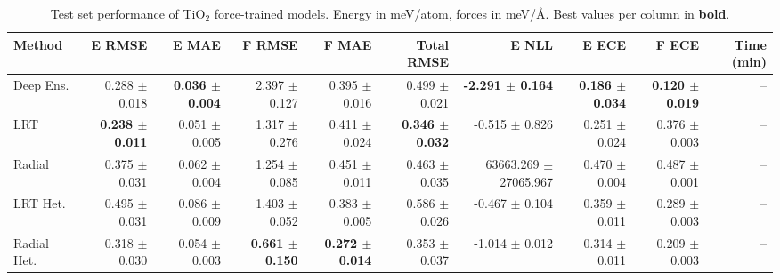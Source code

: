 \begin{table}
\centering
\caption{Test set performance of TiO$_2$ force-trained models. Energy in meV/atom, forces in meV/\AA{}. Best values per column in \textbf{bold}.}
\label{tab:tio2_results}
\begin{tabular}{lrrrrrrrrr}
\toprule
Method & E RMSE & E MAE & F RMSE & F MAE & Total RMSE & E NLL & E ECE & F ECE & Time (min) \\
\midrule
Deep Ens. & 0.288 $\pm$ 0.018 & \textbf{0.036 $\pm$ 0.004} & 2.397 $\pm$ 0.127 & 0.395 $\pm$ 0.016 & 0.499 $\pm$ 0.021 & \textbf{-2.291 $\pm$ 0.164} & \textbf{0.186 $\pm$ 0.034} & \textbf{0.120 $\pm$ 0.019} & -- \\
LRT & \textbf{0.238 $\pm$ 0.011} & 0.051 $\pm$ 0.005 & 1.317 $\pm$ 0.276 & 0.411 $\pm$ 0.024 & \textbf{0.346 $\pm$ 0.032} & -0.515 $\pm$ 0.826 & 0.251 $\pm$ 0.024 & 0.376 $\pm$ 0.003 & -- \\
Radial & 0.375 $\pm$ 0.031 & 0.062 $\pm$ 0.004 & 1.254 $\pm$ 0.085 & 0.451 $\pm$ 0.011 & 0.463 $\pm$ 0.035 & 63663.269 $\pm$ 27065.967 & 0.470 $\pm$ 0.004 & 0.487 $\pm$ 0.001 & -- \\
LRT Het. & 0.495 $\pm$ 0.031 & 0.086 $\pm$ 0.009 & 1.403 $\pm$ 0.052 & 0.383 $\pm$ 0.005 & 0.586 $\pm$ 0.026 & -0.467 $\pm$ 0.104 & 0.359 $\pm$ 0.011 & 0.289 $\pm$ 0.003 & -- \\
Radial Het. & 0.318 $\pm$ 0.030 & 0.054 $\pm$ 0.003 & \textbf{0.661 $\pm$ 0.150} & \textbf{0.272 $\pm$ 0.014} & 0.353 $\pm$ 0.037 & -1.014 $\pm$ 0.012 & 0.314 $\pm$ 0.011 & 0.209 $\pm$ 0.003 & -- \\
\bottomrule
\end{tabular}
\end{table}